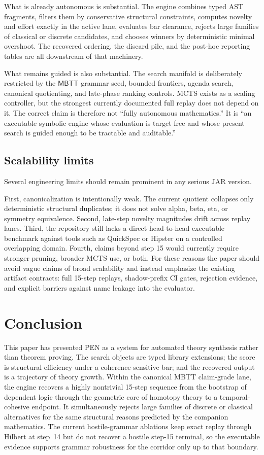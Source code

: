 \documentclass[pdflatex,sn-mathphys,Numbered]{sn-jnl}
\theoremstyle{thmstyleone}
\theoremstyle{thmstylethree}
\theoremstyle{thmstyletwo}
\newcommand{\MBTT}{\ensuremath{\mathsf{MBTT}}}
\begin{document}
What is already autonomous is substantial. The engine combines typed AST fragments, filters them by conservative structural constraints, computes novelty and effort exactly in the active lane, evaluates bar clearance, rejects large families of classical or discrete candidates, and chooses winners by deterministic minimal overshoot. The recovered ordering, the discard pile, and the post-hoc reporting tables are all downstream of that machinery.

What remains guided is also substantial. The search manifold is deliberately restricted by the \MBTT{} grammar seed, bounded frontiers, agenda search, canonical quotienting, and late-phase ranking controls. MCTS exists as a scaling controller, but the strongest currently documented full replay does not depend on it. The correct claim is therefore not ``fully autonomous mathematics.'' It is ``an executable symbolic engine whose evaluation is target free and whose present search is guided enough to be tractable and auditable.''

\subsection{Scalability limits}

Several engineering limits should remain prominent in any serious JAR version.

First, canonicalization is intentionally weak. The current quotient collapses only deterministic structural duplicates; it does not solve alpha, beta, eta, or symmetry equivalence. Second, late-step novelty magnitudes drift across replay lanes. Third, the repository still lacks a direct head-to-head executable benchmark against tools such as QuickSpec or Hipster on a controlled overlapping domain. Fourth, claims beyond step 15 would currently require stronger pruning, broader MCTS use, or both. For these reasons the paper should avoid vague claims of broad scalability and instead emphasize the existing artifact contracts: full 15-step replays, shadow-prefix CI gates, rejection evidence, and explicit barriers against name leakage into the evaluator.

\section{Conclusion}\label{sec:conclusion}

This paper has presented PEN as a system for automated theory synthesis rather than theorem proving. The search objects are typed library extensions; the score is structural efficiency under a coherence-sensitive bar; and the recovered output is a trajectory of theory growth. Within the canonical MBTT claim-grade lane, the engine recovers a highly nontrivial 15-step sequence from the bootstrap of dependent logic through the geometric core of homotopy theory to a temporal-cohesive endpoint. It simultaneously rejects large families of discrete or classical alternatives for the same structural reasons predicted by the companion mathematics. The current hostile-grammar ablations keep exact replay through Hilbert at step~14 but do not recover a hostile step-15 terminal, so the executable evidence supports grammar robustness for the corridor only up to that boundary.
\end{document}
